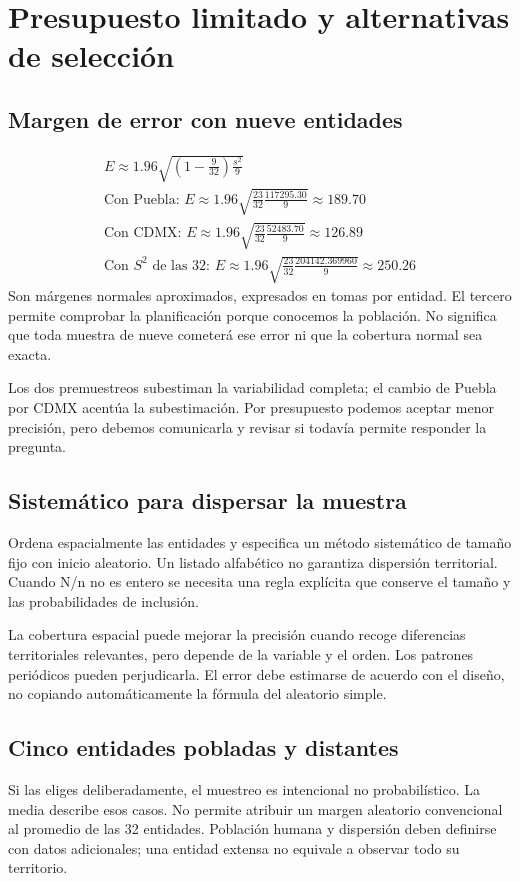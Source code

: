 \documentclass[11pt,letterpaper]{article}
\begin{document}
\clearpage
\section{Presupuesto limitado y alternativas de selección}
\subsection{Margen de error con nueve entidades}
\begin{gather*}E\approx1.96\sqrt{\left(1-\frac9{32}\right)\frac{s^2}{9}}\\[3pt]\text{Con Puebla: } E\approx1.96\sqrt{\frac{23}{32}\frac{117295.30}{9}}\approx189.70\\[3pt]\text{Con CDMX: } E\approx1.96\sqrt{\frac{23}{32}\frac{52483.70}{9}}\approx126.89\\[3pt]\text{Con }S^2\text{ de las 32: }E\approx1.96\sqrt{\frac{23}{32}\frac{204142.369960}{9}}\approx250.26\end{gather*}
Son márgenes normales aproximados, expresados en tomas por entidad. El tercero permite comprobar la planificación porque conocemos la población. No significa que toda muestra de nueve cometerá ese error ni que la cobertura normal sea exacta.

Los dos premuestreos subestiman la variabilidad completa; el cambio de Puebla por CDMX acentúa la subestimación. Por presupuesto podemos aceptar menor precisión, pero debemos comunicarla y revisar si todavía permite responder la pregunta.

\subsection{Sistemático para dispersar la muestra}
Ordena espacialmente las entidades y especifica un método sistemático de tamaño fijo con inicio aleatorio. Un listado alfabético no garantiza dispersión territorial. Cuando N/n no es entero se necesita una regla explícita que conserve el tamaño y las probabilidades de inclusión.

La cobertura espacial puede mejorar la precisión cuando recoge diferencias territoriales relevantes, pero depende de la variable y el orden. Los patrones periódicos pueden perjudicarla. El error debe estimarse de acuerdo con el diseño, no copiando automáticamente la fórmula del aleatorio simple.

\subsection{Cinco entidades pobladas y distantes}
Si las eliges deliberadamente, el muestreo es intencional no probabilístico. La media describe esos casos. No permite atribuir un margen aleatorio convencional al promedio de las 32 entidades. Población humana y dispersión deben definirse con datos adicionales; una entidad extensa no equivale a observar todo su territorio.
\end{document}
